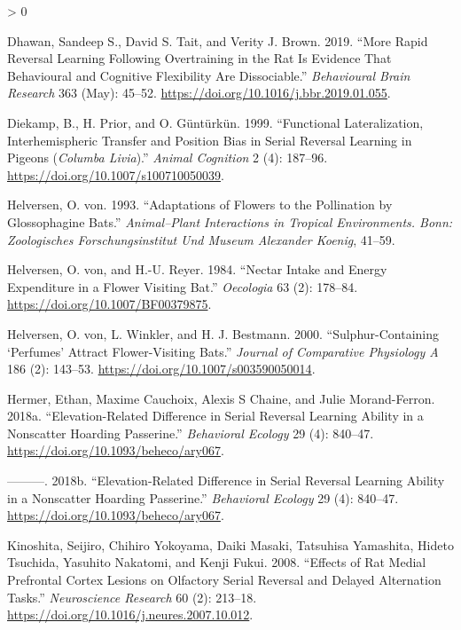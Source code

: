 \documentclass[
]{article}
\newlength{\cslhangindent}
\newenvironment{CSLReferences}[2] %
 {%
  \setlength{\parindent}{0pt}
  \ifodd #1 \everypar{\setlength{\hangindent}{\cslhangindent}}\ignorespaces\fi
  \ifnum #2 > 0
  \setlength{\parskip}{#2\baselineskip}
  \fi
 }%
 {}
\begin{document}
\begin{CSLReferences}{1}{0}
\leavevmode\hypertarget{ref-dhawan_more_2019}{}%
Dhawan, Sandeep S., David S. Tait, and Verity J. Brown. 2019. {``More Rapid Reversal Learning Following Overtraining in the Rat Is Evidence That Behavioural and Cognitive Flexibility Are Dissociable.''} \emph{Behavioural Brain Research} 363 (May): 45--52. \url{https://doi.org/10.1016/j.bbr.2019.01.055}.

\leavevmode\hypertarget{ref-diekamp_functional_1999}{}%
Diekamp, B., H. Prior, and O. Güntürkün. 1999. {``Functional Lateralization, Interhemispheric Transfer and Position Bias in Serial Reversal Learning in Pigeons (\emph{{Columba} Livia}).''} \emph{Animal Cognition} 2 (4): 187--96. \url{https://doi.org/10.1007/s100710050039}.

\leavevmode\hypertarget{ref-von_helversen_adaptations_1993}{}%
Helversen, O. von. 1993. {``Adaptations of Flowers to the Pollination by {Glossophagine} Bats.''} \emph{Animal--Plant Interactions in Tropical Environments. Bonn: Zoologisches Forschungsinstitut Und Museum Alexander Koenig}, 41--59.

\leavevmode\hypertarget{ref-von_helversen_nectar_1984}{}%
Helversen, O. von, and H.-U. Reyer. 1984. {``Nectar Intake and Energy Expenditure in a Flower Visiting Bat.''} \emph{Oecologia} 63 (2): 178--84. \url{https://doi.org/10.1007/BF00379875}.

\leavevmode\hypertarget{ref-von_helversen_sulphur-containing_2000}{}%
Helversen, O. von, L. Winkler, and H. J. Bestmann. 2000. {``Sulphur-Containing {`Perfumes'} Attract Flower-Visiting Bats.''} \emph{Journal of Comparative Physiology A} 186 (2): 143--53. \url{https://doi.org/10.1007/s003590050014}.

\leavevmode\hypertarget{ref-hermer_elevation-related_2018}{}%
Hermer, Ethan, Maxime Cauchoix, Alexis S Chaine, and Julie Morand-Ferron. 2018a. {``Elevation-Related Difference in Serial Reversal Learning Ability in a Nonscatter Hoarding Passerine.''} \emph{Behavioral Ecology} 29 (4): 840--47. \url{https://doi.org/10.1093/beheco/ary067}.

\leavevmode\hypertarget{ref-hermer_elevation-related_2018-1}{}%
---------. 2018b. {``Elevation-Related Difference in Serial Reversal Learning Ability in a Nonscatter Hoarding Passerine.''} \emph{Behavioral Ecology} 29 (4): 840--47. \url{https://doi.org/10.1093/beheco/ary067}.

\leavevmode\hypertarget{ref-kinoshita_effects_2008}{}%
Kinoshita, Seijiro, Chihiro Yokoyama, Daiki Masaki, Tatsuhisa Yamashita, Hideto Tsuchida, Yasuhito Nakatomi, and Kenji Fukui. 2008. {``Effects of Rat Medial Prefrontal Cortex Lesions on Olfactory Serial Reversal and Delayed Alternation Tasks.''} \emph{Neuroscience Research} 60 (2): 213--18. \url{https://doi.org/10.1016/j.neures.2007.10.012}.


\end{CSLReferences}
\end{document}
